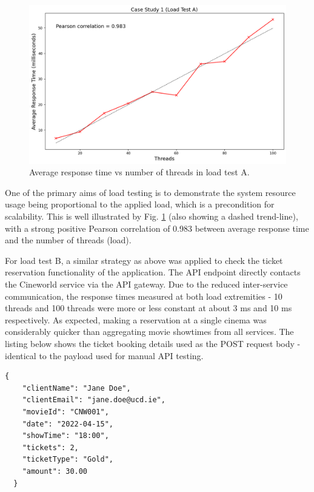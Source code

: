 \begin{figure}[H]
  \centering
  \includegraphics[width=0.8\linewidth]{./assets/images/case-study-01/cs01-lta-4.png}
  \caption{Average response time vs number of threads in load test A.}
  \label{fig:cs01-lta-4}
\end{figure}

One of the primary aims of load testing is to demonstrate the system resource usage being proportional to the applied load, which is a precondition for scalability. This is well illustrated by Fig. \ref{fig:cs01-lta-4} (also showing a dashed trend-line), with a strong positive Pearson correlation of 0.983 between average response time and the number of threads (load).

For load test B, a similar strategy as above was applied to check the ticket reservation functionality of the application. The API endpoint  directly contacts the Cineworld service via the API gateway. Due to the reduced inter-service communication, the response times measured at both load extremities - 10 threads and 100 threads were more or less constant at about 3 ms and 10 ms respectively. As expected, making a reservation at a single cinema was considerably quicker than aggregating movie showtimes from all services. The listing below shows the ticket booking details used as the POST request body - identical to the payload used for manual API testing.

\begin{lstlisting}[caption=Dummy payload for load test B POST request.]
  {
    "clientName": "Jane Doe",
    "clientEmail": "jane.doe@ucd.ie",
    "movieId": "CNW001",
    "date": "2022-04-15",
    "showTime": "18:00",
    "tickets": 2,
    "ticketType": "Gold",
    "amount": 30.00
  }
\end{lstlisting}


